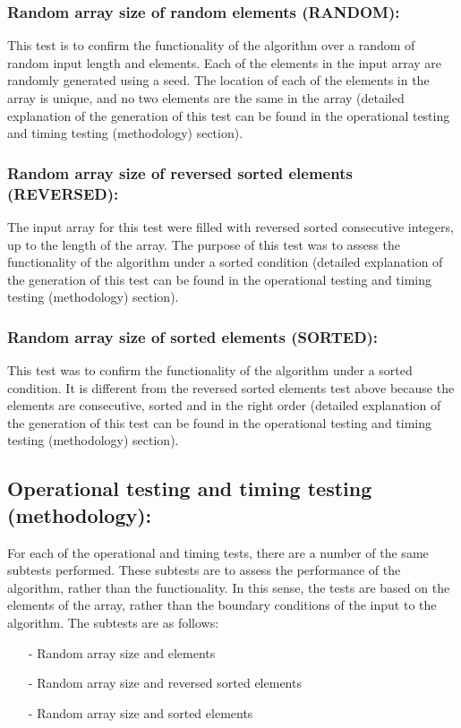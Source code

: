\documentclass[12pt]{article}
\begin{document}
\subsubsection{Random array size of random elements (RANDOM): }
This test is to confirm the functionality of the algorithm over a random of random input length and elements. Each of the elements in the input array are randomly generated using a seed. The location of each of the elements in the array is unique, and no two elements are the same in the array (detailed explanation of the generation of this test can be found in the operational testing and timing testing (methodology) section).

\subsubsection{Random array size of reversed sorted elements (REVERSED): }
The input array for this test were filled with reversed sorted consecutive integers, up to the length of the array. The purpose of this test was to assess the functionality of the algorithm under a sorted condition (detailed explanation of the generation of this test can be found in the operational testing and timing testing (methodology) section).

\subsubsection{Random array size of sorted elements (SORTED): }
This test was to confirm the functionality of the algorithm under a sorted condition. It is different from the reversed sorted elements test above because the elements are consecutive, sorted and in the right order (detailed explanation of the generation of this test can be found in the operational testing and timing testing (methodology) section).

\subsection{Operational testing and timing testing (methodology):}
For each of the operational and timing tests, there are a number of the same subtests performed. These subtests are to assess the performance of the algorithm, rather than the functionality. In this sense, the tests are based on the elements of the array, rather than the boundary conditions of the input to the algorithm. The subtests are as follows:
\begin{itemize}
	\item[-]Random array size and elements
	\item[-]Random array size and reversed sorted elements
	\item[-]Random array size and sorted elements
\end{itemize}
\end{document}
